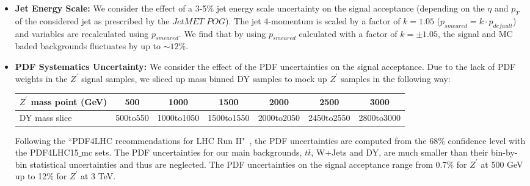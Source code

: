 \begin{itemize}
  \item \textbf{Jet Energy Scale:} We consider the effect of a 3-5\% jet energy scale uncertainty on the signal 
acceptance (depending on the $\eta$ and $p_{T}$ of the considered jet as prescribed by the $JetMET$ $POG$). The jet 
4-momentum is scaled by a factor of $k=1.05$ ($p_{smeared} = k \cdot p_{default}$) and variables are recalculated 
using $p_{smeared}$. We find that by using $p_{smeared}$ calculated with
a factor of $k=\pm 1.05$, the signal and MC baded backgrounds fluctuates by up to $\sim 12$\%. 
%

  \item \textbf{PDF Systematics Uncertainty:} We consider the effect of the PDF uncertainties on the signal acceptance. 
Due to the lack of PDF weights in the $Z^\prime$ signal samples, we sliced up mass binned DY samples to mock up $Z^\prime$ samples in 
the following way:
\begin{table}[htbp!]	
  \begin{tabular}{| l | c | c | c | c | c | c |} 
  \hline\hline 
  $Z^\prime$ mass point (GeV) & 500 & 1000 & 1500 & 2000 & 2500 & 3000\\
  \hline
  DY mass slice & 500to550 & 1000to1050 & 1500to1550 & 2000to2050 & 2450to2550 & 2800to3000\\
  \hline \hline
  \end{tabular}
\end{table}

Following the ``PDF4LHC recommendations for LHC Run
II"~\cite{PDF4LHC15}, the PDF uncertainties are computed from the
68$\%$ confidence level with the PDF4LHC15$\_$mc sets. The PDF
uncertainties for our main backgrounds, $t\bar{t}$, W+Jets and DY, are
much smaller than their bin-by-bin statistical uncertainties and thus are
neglected. The PDF uncertainties on the signal acceptance range from
0.7$\%$ for $Z^\prime$ at 500 GeV up to 12$\%$ for $Z^\prime$ at 3 TeV.



\end{itemize}
